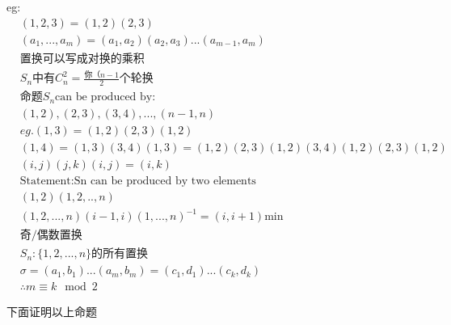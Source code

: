\documentclass[12pt, a4paper]{article}  %
\begin{document}
eg:
\begin{align}
    &(1,2,3)=(1,2)(2,3)\\
    &(a_1,...,a_m)=(a_1,a_2)(a_2,a_3)...(a_{m-1},a_m)\\
    &\text{置换可以写成对换的乘积}\\
    &S_n\text{中有}C_n^2=\frac{你（n-1}{2}\text{个轮换}\\
    &\text{命题} S_n\text{can be produced by:}\\
    &(1,2),(2,3),(3,4),...,(n-1,n)\\
    &eg. (1,3)=(1,2)(2,3)(1,2)\\
    &(1,4)=(1,3)(3,4)(1,3)=(1,2)(2,3)(1,2)(3,4)(1,2)(2,3)(1,2)\\
    &(i,j)(j,k)(i,j)=(i,k)\\
    &\text{Statement:Sn can be produced by two elements}\\
    &(1,2)(1,2,..,n) \\
    &(1,2,...,n)(i-1,i)(1,...,n)^{-1}=(i,i+1)\text{min }\\
    &\text{奇/偶数置换}\\
    &S_n: \{1,2,...,n\}\text{的所有置换}\\
    &\sigma=(a_1,b_1)...(a_m,b_m)=(c_1,d_1)...(c_k,d_k)\\
    &\therefore m\equiv k \mod 2
\end{align}

下面证明以上命题
\end{document}
